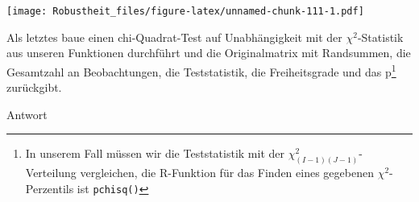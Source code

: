 \documentclass[
]{book}
\newenvironment{Shaded}{\begin{snugshade}}{\end{snugshade}}
\newcommand{\AttributeTok}[1]{\textcolor[rgb]{0.77,0.63,0.00}{#1}}
\newcommand{\DecValTok}[1]{\textcolor[rgb]{0.00,0.00,0.81}{#1}}
\newcommand{\FunctionTok}[1]{\textcolor[rgb]{0.00,0.00,0.00}{#1}}
\newcommand{\NormalTok}[1]{#1}
\newcommand{\OtherTok}[1]{\textcolor[rgb]{0.56,0.35,0.01}{#1}}
\newcommand{\SpecialCharTok}[1]{\textcolor[rgb]{0.00,0.00,0.00}{#1}}
\newcommand{\StringTok}[1]{\textcolor[rgb]{0.31,0.60,0.02}{#1}}
\begin{document}
\begin{Shaded}
\end{Shaded}

\texttt{[image: Robustheit\_files/figure-latex/unnamed-chunk-111-1.pdf]}

Als letztes baue einen chi-Quadrat-Test auf Unabhängigkeit mit der \(\chi^2\)-Statistik aus unseren Funktionen durchführt und die Originalmatrix mit Randsummen, die Gesamtzahl an Beobachtungen, die Teststatistik, die Freiheitsgrade und das p\footnote{In unserem Fall müssen wir die Teststatistik mit der \(\chi^2_{(I-1)(J-1)}\)-Verteilung vergleichen, die R-Funktion für das Finden eines gegebenen \(\chi^2\)-Perzentils ist \texttt{pchisq()}} zurückgibt.

Antwort
\end{document}
